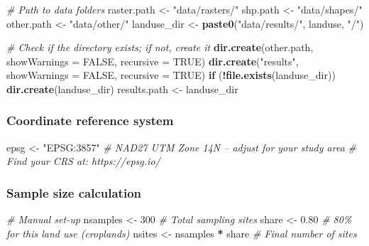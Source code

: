 \documentclass[
  10pt,
  b5paper,
  oneside]{book}
\newenvironment{Shaded}{\begin{snugshade}}{\end{snugshade}}
\newcommand{\AttributeTok}[1]{\textcolor[rgb]{0.13,0.29,0.53}{#1}}
\newcommand{\CommentTok}[1]{\textcolor[rgb]{0.56,0.35,0.01}{\textit{#1}}}
\newcommand{\ConstantTok}[1]{\textcolor[rgb]{0.56,0.35,0.01}{#1}}
\newcommand{\ControlFlowTok}[1]{\textcolor[rgb]{0.13,0.29,0.53}{\textbf{#1}}}
\newcommand{\DecValTok}[1]{\textcolor[rgb]{0.00,0.00,0.81}{#1}}
\newcommand{\FloatTok}[1]{\textcolor[rgb]{0.00,0.00,0.81}{#1}}
\newcommand{\FunctionTok}[1]{\textcolor[rgb]{0.13,0.29,0.53}{\textbf{#1}}}
\newcommand{\NormalTok}[1]{#1}
\newcommand{\OtherTok}[1]{\textcolor[rgb]{0.56,0.35,0.01}{#1}}
\newcommand{\SpecialCharTok}[1]{\textcolor[rgb]{0.81,0.36,0.00}{\textbf{#1}}}
\newcommand{\StringTok}[1]{\textcolor[rgb]{0.31,0.60,0.02}{#1}}
\begin{document}
\begin{Shaded}
\begin{Highlighting}[]
\CommentTok{\# Path to data folders}
\NormalTok{raster.path }\OtherTok{\textless{}{-}} \StringTok{"data/rasters/"}
\NormalTok{shp.path }\OtherTok{\textless{}{-}} \StringTok{"data/shapes/"}
\NormalTok{other.path }\OtherTok{\textless{}{-}} \StringTok{"data/other/"}
\NormalTok{landuse\_dir }\OtherTok{\textless{}{-}} \FunctionTok{paste0}\NormalTok{(}\StringTok{"data/results/"}\NormalTok{, landuse, }\StringTok{"/"}\NormalTok{)}
   
\CommentTok{\# Check if the directory exists; if not, create it}
\FunctionTok{dir.create}\NormalTok{(other.path, }\AttributeTok{showWarnings =} \ConstantTok{FALSE}\NormalTok{, }\AttributeTok{recursive =} \ConstantTok{TRUE}\NormalTok{)}
\FunctionTok{dir.create}\NormalTok{(}\StringTok{"results"}\NormalTok{,  }\AttributeTok{showWarnings =} \ConstantTok{FALSE}\NormalTok{, }\AttributeTok{recursive =} \ConstantTok{TRUE}\NormalTok{)}
\ControlFlowTok{if}\NormalTok{ (}\SpecialCharTok{!}\FunctionTok{file.exists}\NormalTok{(landuse\_dir)) }\FunctionTok{dir.create}\NormalTok{(landuse\_dir)}
\NormalTok{results.path }\OtherTok{\textless{}{-}}\NormalTok{ landuse\_dir}
\end{Highlighting}
\end{Shaded}

\subsubsection{Coordinate reference system}\label{coordinate-reference-system}

\begin{Shaded}
\begin{Highlighting}[]
\NormalTok{epsg }\OtherTok{\textless{}{-}} \StringTok{"EPSG:3857"}  \CommentTok{\# NAD27 UTM Zone 14N – adjust for your study area}
\CommentTok{\# Find your CRS at: https://epsg.io/}
\end{Highlighting}
\end{Shaded}

\subsubsection{Sample size calculation}\label{sample-size-calculation}

\begin{Shaded}
\begin{Highlighting}[]
\CommentTok{\# Manual set{-}up}
\NormalTok{nsamples }\OtherTok{\textless{}{-}} \DecValTok{300}  \CommentTok{\# Total sampling sites}
\NormalTok{share }\OtherTok{\textless{}{-}} \FloatTok{0.80}    \CommentTok{\# 80\% for this land use (croplands)}
\NormalTok{nsites }\OtherTok{\textless{}{-}}\NormalTok{ nsamples }\SpecialCharTok{*}\NormalTok{ share  }\CommentTok{\# Final number of sites}
\end{Highlighting}
\end{Shaded}
\end{document}
